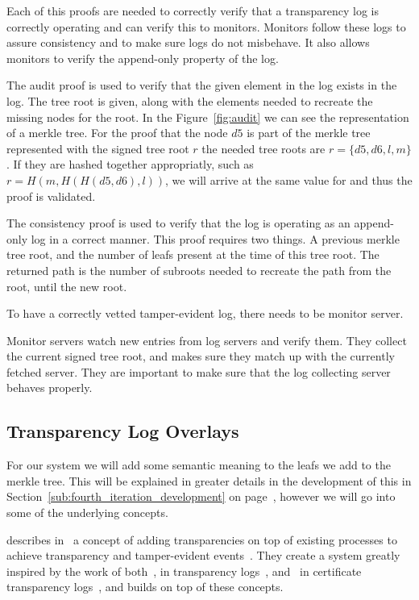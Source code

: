 \documentclass[../Main/thesis.tex]{subfiles}
\begin{document}
Each of this proofs are needed to correctly verify that a transparency log
is correctly operating and can verify this to monitors.  Monitors follow
these logs to assure consistency and to make sure logs do not misbehave. It
also allows monitors to verify the append-only property of the log.

The audit proof is used to verify that the given element in the log exists
in the log. The tree root is given, along with the elements needed to
recreate the missing nodes for the root. In the Figure~\ref{fig:audit} we can
see the representation of a merkle tree. For the proof that the node $ d5 $ is
part of the merkle tree represented with the signed tree root $ r $ the needed
tree roots are $ r = \{ d5, d6, l, m \} $. If they are hashed together
appropriatly, such as $ r = H( m, H( H(d5, d6), l)) $, we will arrive at the
same value for and thus the proof is validated.

The consistency proof is used to verify that the log is operating as an
append-only log in a correct manner. This proof requires two things. A
previous merkle tree root, and the number of leafs present at the time of
this tree root. The returned path is the number of subroots needed to
recreate the path from the root, until the new root.

To have a correctly vetted tamper-evident log, there needs to be monitor server.

Monitor servers watch new entries from log servers and verify them. They
collect the current signed tree root, and makes sure they match up with the
currently fetched server. They are important to make sure that the log
collecting server behaves properly.

\subsection*{Transparency Log Overlays}%
\label{sub:transparency_log_overlays}
For our system we will add some semantic meaning to the leafs we add to the
merkle tree. This will be explained in greater details in the development of
this in Section~\ref{sub:fourth_iteration_development} on
page~\pageref{sub:fourth_iteration_development}, however we will go into some of
the underlying concepts.

\citeauthor{10.11452976749.2978404} describes
in~ a concept of adding transparencies on top
of existing processes to achieve transparency and tamper-evident
events~\cite{10.11452976749.2978404}. They create a system greatly inspired by
the work of both~\citeauthor{182788}, in transparency logs~\cite{182788},
and~\citeauthor{b.-laurie-a.-langley-e.kaster-google-2013} in certificate
transparency logs~\cite{b.-laurie-a.-langley-e.kaster-google-2013}, and builds
on top of these concepts.
\end{document}
